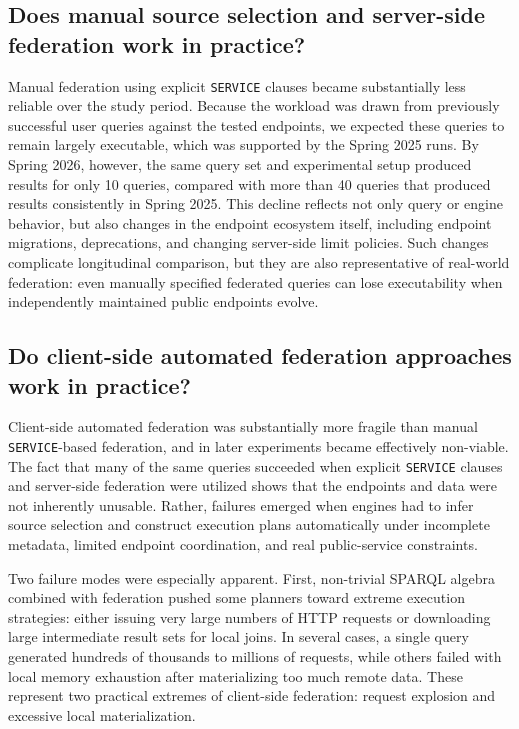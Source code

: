 \documentclass[runningheads]{llncs}
\begin{document}
\subsection{Does manual source selection and server-side federation work in practice?}
Manual federation using explicit \texttt{SERVICE} clauses became substantially less reliable over the study period. 
Because the workload was drawn from previously successful user queries against the tested endpoints, we expected these queries to remain largely executable, which was supported by the Spring 2025 runs. 
By Spring 2026, however, the same query set and experimental setup produced results for only 10 queries, compared with more than 40 queries that produced results consistently in Spring 2025. 
This decline reflects not only query or engine behavior, but also changes in the endpoint ecosystem itself, including endpoint migrations, deprecations, and changing server-side limit policies. 
Such changes complicate longitudinal comparison, but they are also representative of real-world federation: even manually specified federated queries can lose executability when independently maintained public endpoints evolve.

\subsection{Do client-side automated federation approaches work in practice?}
Client-side automated federation was substantially more fragile than manual \texttt{SERVICE}-based federation, and in later experiments became effectively non-viable. 
The fact that many of the same queries succeeded when explicit \texttt{SERVICE} clauses and server-side federation were utilized shows that the endpoints and data were not inherently unusable. 
Rather, failures emerged when engines had to infer source selection and construct execution plans automatically under incomplete metadata, limited endpoint coordination, and real public-service constraints.

Two failure modes were especially apparent. 
First, non-trivial SPARQL algebra combined with federation pushed some planners toward extreme execution strategies: either issuing very large numbers of HTTP requests or downloading large intermediate result sets for local joins. 
In several cases, a single query generated hundreds of thousands to millions of requests, while others failed with local memory exhaustion after materializing too much remote data. 
These represent two practical extremes of client-side federation: request explosion and excessive local materialization.
\end{document}
